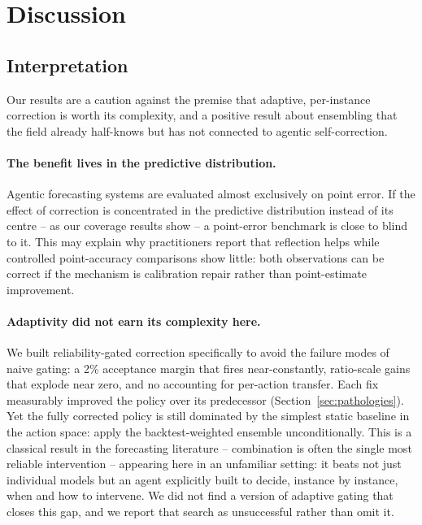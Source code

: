 \section{Discussion}
\label{sec:discussion}

\subsection{Interpretation}

Our results are a caution against the premise that adaptive, per-instance correction is
worth its complexity, and a positive result about ensembling that the field already
half-knows but has not connected to agentic self-correction.

\paragraph{The benefit lives in the predictive distribution.}
Agentic forecasting systems are evaluated almost exclusively on point error. If the
effect of correction is concentrated in the predictive distribution instead of its
centre -- as our coverage results show -- a point-error benchmark is close to blind to
it. This may explain why practitioners report that reflection helps while controlled
point-accuracy comparisons show little: both observations can be correct if the
mechanism is calibration repair rather than point-estimate improvement.

\paragraph{Adaptivity did not earn its complexity here.}
We built reliability-gated correction specifically to avoid the failure modes of naive
gating: a 2\% acceptance margin that fires near-constantly, ratio-scale gains that
explode near zero, and no accounting for per-action transfer. Each fix measurably
improved the policy over its predecessor (Section~\ref{sec:pathologies}). Yet the fully
corrected policy is still dominated by the simplest static baseline in the action space:
apply the backtest-weighted ensemble unconditionally. This is a classical result in the
forecasting literature -- combination is often the single most reliable intervention
\citep{fforma2020} -- appearing here in an unfamiliar setting: it beats not just
individual models but an agent explicitly built to decide, instance by instance, when
and how to intervene. We did not find a version of adaptive gating that closes this gap,
and we report that search as unsuccessful rather than omit it.

